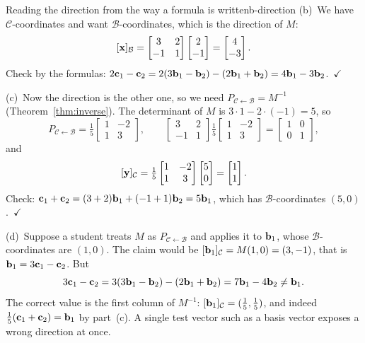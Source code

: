\documentclass[11pt]{article}
\begin{document}
\begin{exmp}{Reading the direction from the way a formula is written}{b-direction}
(b)~We have $\mathcal{C}$-coordinates and want $\mathcal{B}$-coordinates, which is the direction of $M$:
\[
[\mathbf{x}]_{\mathcal{B}}=\begin{bmatrix}3&2\\-1&1\end{bmatrix}\begin{bmatrix}2\\-1\end{bmatrix}=\begin{bmatrix}4\\-3\end{bmatrix}.
\]
Check by the formulas: $2\mathbf{c}_1-\mathbf{c}_2=2(3\mathbf{b}_1-\mathbf{b}_2)-(2\mathbf{b}_1+\mathbf{b}_2)=4\mathbf{b}_1-3\mathbf{b}_2$.\ $\checkmark$

(c)~Now the direction is the other one, so we need $P_{\mathcal{C}\leftarrow\mathcal{B}}=M^{-1}$ (Theorem~\ref{thm:inverse}). The determinant of $M$ is $3\cdot1-2\cdot(-1)=5$, so
\[
P_{\mathcal{C}\leftarrow\mathcal{B}}=\tfrac15\begin{bmatrix}1&-2\\1&3\end{bmatrix},\qquad \begin{bmatrix}3&2\\-1&1\end{bmatrix}\tfrac15\begin{bmatrix}1&-2\\1&3\end{bmatrix}=\begin{bmatrix}1&0\\0&1\end{bmatrix},
\]
and
\[
[\mathbf{y}]_{\mathcal{C}}=\tfrac15\begin{bmatrix}1&-2\\1&3\end{bmatrix}\begin{bmatrix}5\\0\end{bmatrix}=\begin{bmatrix}1\\1\end{bmatrix}.
\]
Check: $\mathbf{c}_1+\mathbf{c}_2=(3+2)\mathbf{b}_1+(-1+1)\mathbf{b}_2=5\mathbf{b}_1$, which has $\mathcal{B}$-coordinates $(5,0)$.\ $\checkmark$

(d)~Suppose a student treats $M$ as $P_{\mathcal{C}\leftarrow\mathcal{B}}$ and applies it to $\mathbf{b}_1$, whose $\mathcal{B}$-coordinates are $(1,0)$. The claim would be $[\mathbf{b}_1]_{\mathcal{C}}=M(1,0)=(3,-1)$, that is $\mathbf{b}_1=3\mathbf{c}_1-\mathbf{c}_2$. But
\[
3\mathbf{c}_1-\mathbf{c}_2=3(3\mathbf{b}_1-\mathbf{b}_2)-(2\mathbf{b}_1+\mathbf{b}_2)=7\mathbf{b}_1-4\mathbf{b}_2\neq\mathbf{b}_1.
\]
The correct value is the first column of $M^{-1}$: $[\mathbf{b}_1]_{\mathcal{C}}=(\tfrac15,\tfrac15)$, and indeed $\tfrac15(\mathbf{c}_1+\mathbf{c}_2)=\mathbf{b}_1$ by part~(c). A single test vector such as a basis vector exposes a wrong direction at once.
\end{exmp}
\end{document}
